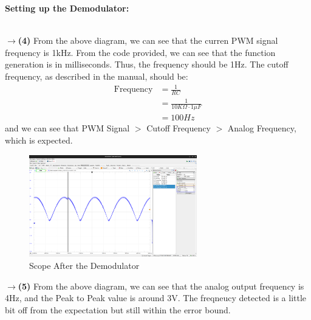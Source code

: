 \documentclass{report}
\begin{document}
    \begin{minipage}{\textwidth}
        \Large
        \textbf{Setting up the Demodulator:}
    \end{minipage}\\[0.5em]
    $\rightarrow$\textbf{(4)} From the above diagram, we can see that the curren PWM signal frequency is 1kHz. From the code provided, we can see that the function generation is in milliseconds. Thus, the frequency should be 1Hz. The cutoff frequency, as described in the manual, should be:
    \begin{align*}
        \text{Frequency} &= \frac{1}{RC}\\
        &= \frac{1}{10K\Omega \cdot 1\mu F}\\
        &= 100Hz
    \end{align*}
    and we can see that PWM Signal $>$ Cutoff Frequency $>$ Analog Frequency, which is expected. 
    \begin{figure}[H]
        \centering
        \includegraphics[width = 0.65\textwidth]{scope4.png}
        \caption{Scope After the Demodulator}
    \end{figure}
    $\rightarrow$\textbf{(5)} From the above diagram, we can see that the analog output frequency is 4Hz, and the Peak to Peak value is around 3V. The freqneucy detected is a little bit off from the expectation but still within the error bound.\\
\end{document}
